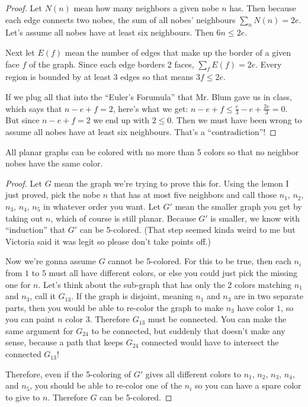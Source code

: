 \documentclass{article}
\begin{document}
\begin{proof}
	Let $N(n)$ mean how many neighbors a given nobe $n$ has. Then because each edge connects two nobes, the sum of all nobes' neighbours $\sum_n N(n) = 2e$. Let's assume all nobes have at least six neighbours. Then $6n \le 2e$.

	Next let $E(f)$ mean the number of edges that make up the border of a given face $f$ of the graph. Since each edge borders 2 faces, $\sum_f E(f) = 2e$. Every region is bounded by at least 3 edges so that means $3f \le 2e$.

	If we plug all that into the ``Euler's Forumula'' that Mr. Blum gave us in class, which says that $n-e+f=2$, here's what we get: $n-e+f \le \frac{e}{3} - e + \frac{2e}{3} = 0$. But since $n-e+f = 2$ we end up with $2\le0$. Then we must have been wrong to assume all nobes have at least six neighbours. That's a ``contradiction''!
\end{proof}

\begin{theorem}
All planar graphs can be colored with no more than 5 colors so that no neighbor nobes have the same color.
\label{thm:5c}
\end{theorem}

\begin{proof}
	Let $G$ mean the graph we're trying to prove this for. Using the lemon I just proved, pick the nobe $n$ that has at most five neighbors and call those $n_1$, $n_2$, $n_3$, $n_4$, $n_5$ in whatever order you want. Let $G'$ mean the smaller graph you get by taking out $n$, which of course is still planar. Because $G'$ is smaller, we know with ``induction'' that $G'$ can be 5-colored. (That step seemed kinda weird to me but Victoria said it was legit so please don't take points off.)

	Now we're gonna assume $G$ cannot be 5-colored. For this to be true, then each $n_i$ from $1$ to $5$ must all have different colors, or else you could just pick the missing one for $n$. Let's think about the sub-graph that has only the 2 colors matching $n_1$ and $n_3$, call it $G_{13}$. If the graph is disjoint, meaning $n_1$ and $n_3$ are in two separate parts, then you would be able to re-color the graph to make $n_3$ have color $1$, so you can paint $n$ color $3$. Therefore $G_{13}$ must be connected. You can make the same argument for $G_{24}$ to be connected, but suddenly that doesn't make any sense, because a path that keeps $G_{24}$ connected would have to intersect the connected $G_{13}$!

	Therefore, even if the 5-coloring of $G'$ gives all different colors to $n_1$, $n_2$, $n_3$, $n_4$, and $n_5$, you should be able to re-color one of the $n_i$ so you can have a spare color to give to $n$. Therefore $G$ can be 5-colored.
\end{proof}
\end{document}

